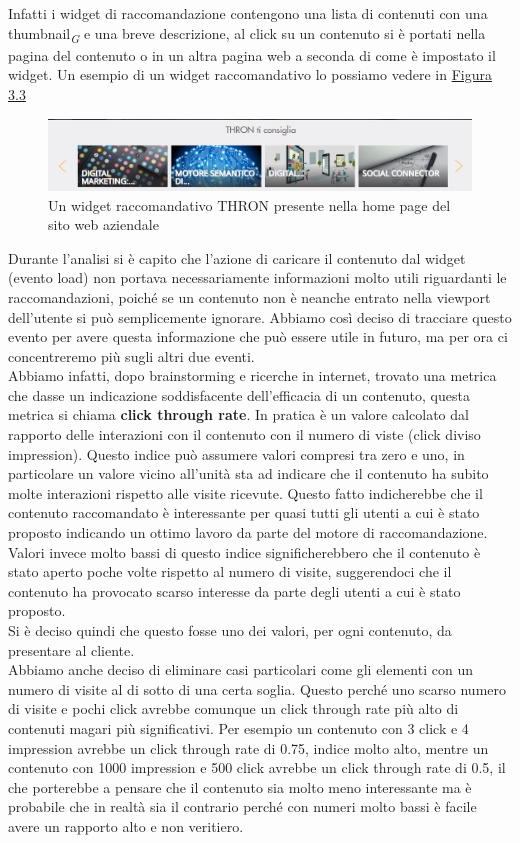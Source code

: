 \documentclass[a4paper, 12pt, twoside, openright]{book}
\newcommand{\gloss}[1]{#1\textsubscript{\textit{\tiny{G}}}}
\begin{document}
Infatti i widget di raccomandazione contengono una lista di contenuti con una \gloss{thumbnail} e una breve descrizione, al click su un contenuto si è portati nella pagina del contenuto o in un altra pagina web a seconda di come è impostato il widget. Un esempio di un widget raccomandativo lo possiamo vedere in \hyperref[pcr-example]{Figura 3.3}
\begin{figure}[H]
	\centering
	\label{pcr-example}
	\includegraphics[width=1.0\textwidth]{images/pcr-example.jpg}
	\caption{Un widget raccomandativo THRON presente nella home page del sito web aziendale}
\end{figure} 

Durante l'analisi si è capito che l'azione di caricare il contenuto dal widget (evento load) non portava necessariamente informazioni molto utili riguardanti le raccomandazioni, poiché se un contenuto non è neanche entrato nella viewport dell'utente si può semplicemente ignorare. Abbiamo così deciso di tracciare questo evento per avere questa informazione che può essere utile in futuro, ma per ora ci concentreremo più sugli altri due eventi.\\

Abbiamo infatti, dopo brainstorming e ricerche in internet, trovato una metrica che dasse un indicazione soddisfacente dell'efficacia di un contenuto, questa metrica si chiama \textbf{click through rate}. In pratica è un valore calcolato dal rapporto delle interazioni con il contenuto con il numero di viste (click diviso impression). Questo indice può assumere valori compresi tra zero e uno, in particolare un valore vicino all'unità sta ad indicare che il contenuto ha subito molte interazioni rispetto alle visite ricevute. Questo fatto indicherebbe che il contenuto raccomandato è interessante per quasi tutti gli utenti a cui è stato proposto indicando un ottimo lavoro da parte del motore di raccomandazione. Valori invece molto bassi di questo indice significherebbero che il contenuto è stato aperto poche volte rispetto al numero di visite, suggerendoci che il contenuto ha provocato scarso interesse da parte degli utenti a cui è stato proposto.\\
Si è deciso quindi che questo fosse uno dei valori, per ogni contenuto, da presentare al cliente.\\
Abbiamo anche deciso di eliminare casi particolari come gli elementi con un numero di visite al di sotto di una certa soglia. Questo perché uno scarso numero di visite e pochi click avrebbe comunque un click through rate più alto di contenuti magari più significativi. Per esempio un contenuto con 3 click e 4 impression avrebbe un click through rate di 0.75, indice molto alto, mentre un contenuto con 1000 impression e 500 click avrebbe un click through rate di 0.5, il che porterebbe a pensare che il contenuto sia molto meno interessante ma è probabile che in realtà sia il contrario perché con numeri molto bassi è facile avere un rapporto alto e non veritiero.\\
\end{document}
